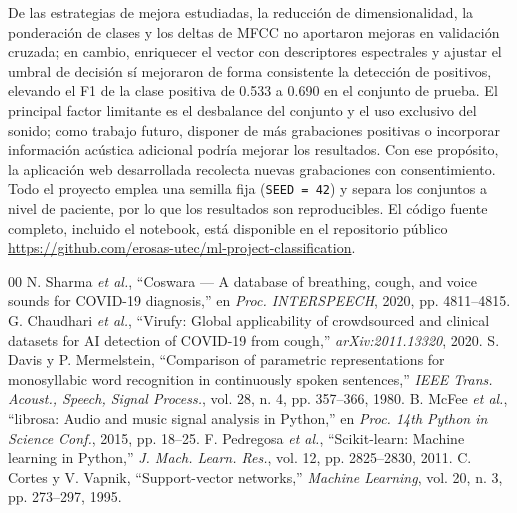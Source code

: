 \documentclass[conference]{IEEEtran}
\begin{document}
De las estrategias de mejora estudiadas, la reducci\'on de dimensionalidad, la ponderaci\'on de clases y los deltas de MFCC no aportaron mejoras en validaci\'on cruzada; en cambio, enriquecer el vector con descriptores espectrales y ajustar el umbral de decisi\'on s\'i mejoraron de forma consistente la detecci\'on de positivos, elevando el F1 de la clase positiva de 0.533 a 0.690 en el conjunto de prueba. El principal factor limitante es el desbalance del conjunto y el uso exclusivo del sonido; como trabajo futuro, disponer de m\'as grabaciones positivas o incorporar informaci\'on ac\'ustica adicional podr\'ia mejorar los resultados. Con ese prop\'osito, la aplicaci\'on web desarrollada recolecta nuevas grabaciones con consentimiento. Todo el proyecto emplea una semilla fija (\texttt{SEED = 42}) y separa los conjuntos a nivel de paciente, por lo que los resultados son reproducibles. El c\'odigo fuente completo, incluido el notebook, est\'a disponible en el repositorio p\'ublico \url{https://github.com/erosas-utec/ml-project-classification}.

\begin{thebibliography}{00}
 N. Sharma \emph{et al.}, ``Coswara --- A database of breathing, cough, and voice sounds for COVID-19 diagnosis,'' en \emph{Proc. INTERSPEECH}, 2020, pp. 4811--4815.
 G. Chaudhari \emph{et al.}, ``Virufy: Global applicability of crowdsourced and clinical datasets for AI detection of COVID-19 from cough,'' \emph{arXiv:2011.13320}, 2020.
 S. Davis y P. Mermelstein, ``Comparison of parametric representations for monosyllabic word recognition in continuously spoken sentences,'' \emph{IEEE Trans. Acoust., Speech, Signal Process.}, vol. 28, n.\textordmasculine{} 4, pp. 357--366, 1980.
 B. McFee \emph{et al.}, ``librosa: Audio and music signal analysis in Python,'' en \emph{Proc. 14th Python in Science Conf.}, 2015, pp. 18--25.
 F. Pedregosa \emph{et al.}, ``Scikit-learn: Machine learning in Python,'' \emph{J. Mach. Learn. Res.}, vol. 12, pp. 2825--2830, 2011.
 C. Cortes y V. Vapnik, ``Support-vector networks,'' \emph{Machine Learning}, vol. 20, n.\textordmasculine{} 3, pp. 273--297, 1995.
\end{thebibliography}
\end{document}
